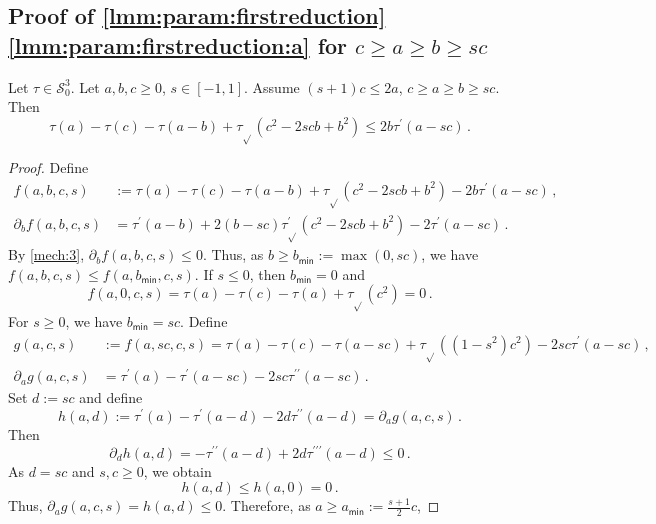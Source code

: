\documentclass{article}
\newcommand*{\mc}[1]{\mathcal{#1}}
\newcommand*{\ms}[1]{\mathsf{#1}}
\newcommand{\pr}{^\prime}
\newcommand{\prr}{^{\prime\prime}}
\newcommand{\prrr}{^{\prime\prime\prime}}
\newcommand{\equationFullstop}{\, .}
\newcommand{\eqfs}{\equationFullstop}
\newcommand{\equationComma}{\, ,}
\newcommand{\eqcm}{\equationComma}
\newcommand{\tran}{\tau}
\newcommand{\trans}{\tran_{\!\sqrt{}}}
\newcommand{\dtrans}{\trans\pr}
\newcommand{\dtran}{\tran\pr}
\newcommand{\ddtran}{\tran\prr}
\newcommand{\dddtran}{\tran\prrr}
\newcommand{\setccod}[1]{\mc S_0^{#1}}
\begin{document}
\begin{appendix}
\subsection{Proof of \cref{lmm:param:firstreduction} \ref{lmm:param:firstreduction:a} for $c \geq a \geq b \geq sc$}\label{ssec:reduicGaGbGsc}
%
%
\begin{lemma}\label{lmm:param:reduicGaGbGsc}
	Let $\tran\in\setccod3$.
	Let $a,b,c\geq0$, $s\in[-1,1]$.
	Assume $(s+1)c\leq 2a$, $c \geq a \geq b \geq sc$.
	Then
	\begin{equation*}
		\tran(a)-\tran(c)-\tran(a-b)+\trans(c^2-2scb+b^2) 
		\leq
		2 b \dtran(a - sc) 
		\eqfs
	\end{equation*}
\end{lemma}
%
\begin{proof}
	Define
	\begin{align*}
		f(a,b,c,s) &:= \tran(a)-\tran(c)-\tran(a-b)+\trans(c^2-2scb+b^2) - 2 b \dtran(a - sc)\eqcm\\
		\partial_b f(a,b,c,s) &= \dtran(a-b) + 2(b-sc)\dtrans(c^2-2scb+b^2) - 2 \dtran(a - sc) 
		\eqfs
	\end{align*}
	By \cref{mech:3}, $\partial_b f(a,b,c,s) \leq 0$. Thus, as $b \geq b_{\ms{min}} := \max(0, sc)$, we have
	$f(a,b,c,s) \leq f(a,b_{\ms{min}},c,s)$.
	If $s \leq 0$, then $b_{\ms{min}}=0$ and
	\begin{equation*}
		f(a,0,c,s)  = \tran(a)-\tran(c)-\tran(a)+\trans(c^2) = 0
		\eqfs
	\end{equation*}
	For $s\geq 0$, we have $b_{\ms{min}}=sc$. Define
	\begin{align}
		g(a,c,s) &:= f(a,sc,c,s) = \tran(a)-\tran(c)-\tran(a-sc)+\trans((1-s^2)c^2) - 2 sc\dtran(a - sc)\eqcm\\
		\partial_a  g(a,c,s) &= \dtran(a)-\dtran(a-sc) - 2 sc\ddtran(a - sc)\eqfs
	\end{align}
	Set $d:= sc$ and define
	\begin{equation}
		h(a, d) := \dtran(a)-\dtran(a-d) - 2 d\ddtran(a - d) = \partial_a  g(a,c,s)\eqfs
	\end{equation}
	Then
	\begin{equation}
		\partial_{d} h(a, d) = -\ddtran(a - d) + 2 d\dddtran(a - d) \leq 0
		\eqfs
	\end{equation}
	As $d = sc$ and $s,c\geq 0$, we obtain
	\begin{equation*}
		h(a, d) \leq h(a, 0) = 0
		\eqfs
	\end{equation*}
	Thus, $\partial_a g(a,c,s) = h(a, d) \leq 0$. Therefore, as $a \geq a_{\ms{min}} := \frac{s+1}{2}c$,

\end{proof}
\end{appendix}
\end{document}
